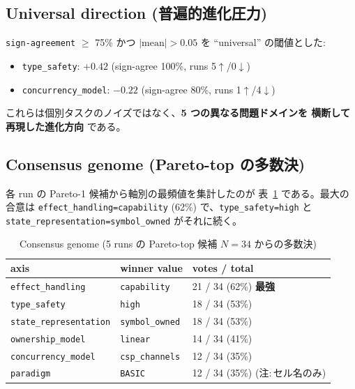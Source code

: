 \documentclass[a4paper,11pt]{article}
\begin{document}
\subsection{Universal direction (普遍的進化圧力)}

\texttt{sign-agreement} \(\geq\) 75\% かつ \(|\mathrm{mean}| > 0.05\)
を ``universal'' の閾値とした:

\begin{itemize}
  \item \texttt{type\_safety}: \(+0.42\) (sign-agree 100\%, runs 5\(\uparrow\)/0\(\downarrow\))
  \item \texttt{concurrency\_model}: \(-0.22\) (sign-agree 80\%, runs 1\(\uparrow\)/4\(\downarrow\))
\end{itemize}

\noindent
これらは個別タスクのノイズではなく、{\bfseries 5 つの異なる問題ドメインを
横断して再現した進化方向} である。

\subsection{Consensus genome (Pareto-top の多数決)}

各 run の Pareto-1 候補から軸別の最頻値を集計したのが
表~\ref{tab:consensus} である。最大の合意は
\texttt{effect\_handling=capability} (62\%) で、\texttt{type\_safety=high}
と \texttt{state\_representation=symbol\_owned} がそれに続く。

\begin{table}[h]
\centering
\caption{Consensus genome (5 runs の Pareto-top 候補 \(N=34\) からの多数決)}
\label{tab:consensus}
\small
\begin{tabular}{lll}
\toprule
axis & winner value & votes / total \\
\midrule
\texttt{effect\_handling}      & \texttt{capability}      & 21 / 34 (62\%) \textbf{最強} \\
\texttt{type\_safety}          & \texttt{high}            & 18 / 34 (53\%) \\
\texttt{state\_representation} & \texttt{symbol\_owned}   & 18 / 34 (53\%) \\
\texttt{ownership\_model}      & \texttt{linear}          & 14 / 34 (41\%) \\
\texttt{concurrency\_model}    & \texttt{csp\_channels}   & 12 / 34 (35\%) \\
\texttt{paradigm}              & \texttt{BASIC}           & 12 / 34 (35\%) (注:\,セル名のみ) \\
\bottomrule
\end{tabular}
\end{table}
\end{document}
